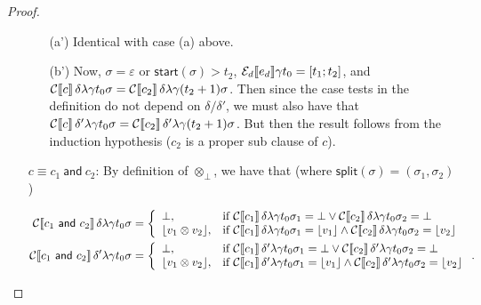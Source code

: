 \documentclass[orivec,final]{llncs-href}
\newcommand{\tracestart}{\mathsf{start}}
\newcommand{\tracesplit}{\mathsf{split}}
\newcommand{\lift}[1]{\lfloor #1 \rfloor}
\newcommand{\trace}{\sigma}
\newcommand{\emptytrace}{\varepsilon}
\newcommand{\cand}[2]{#1\ \mathsf{and}\ #2}
\newcommand{\canddefault}{\cand{c_1}{c_2}}
\begin{document}
\begin{proof}
\begin{itemize}
\begin{itemize}
      \item[(a')] Identical with case (a) above.
      \item[(b')] Now, $\trace = \emptytrace$ or $\tracestart(\trace)
        > t_2$, $\mathcal{E}_d\llbracket e_d \rrbracket \gamma t_0 = [t_1;t_2]$, and
        $\cdenclause{c}{\delta}{\lambda}{\gamma}{t_0}{\trace} =
        \cdenclause{c_2}{\delta}{\lambda}{\gamma}{(t_2+1)}{\trace}$. Then
        since the case tests in the definition do not depend on
        $\delta/\delta'$, we must also have that
        $\cdenclause{c}{\delta'}{\lambda}{\gamma}{t_0}{\trace} = 
        \cdenclause{c_2}{\delta'}{\lambda}{\gamma}{(t_2+1)}{\trace}$. But then the
        result follows from the induction hypothesis ($c_2$ is a proper
        sub clause of $c$).
      \end{itemize}
  \item[$c \equiv \canddefault$:]
    By definition of $\otimes_\bot$, we have that (where
    $\tracesplit(\trace) = (\trace_1,\trace_2)$)
    \begin{scriptsize}
      \begin{align*}
        \cdenclause{\canddefault}{\delta}{\lambda}{\gamma}{t_0}{\trace} &=
        \left\{ \begin{array}{ll}
            \bot, &\mbox{if }
            \cdenclause{c_1}{\delta}{\lambda}{\gamma}{t_0}{\trace_1} =
            \bot \lor
            \cdenclause{c_2}{\delta}{\lambda}{\gamma}{t_0}{\trace_2} =
            \bot\\
            \lift{v_1 \otimes v_2}, &\mbox{if }
            \cdenclause{c_1}{\delta}{\lambda}{\gamma}{t_0}{\trace_1} = 
            \lift{v_1} \land
            \cdenclause{c_2}{\delta}{\lambda}{\gamma}{t_0}{\trace_2} =
            \lift{v_2}
          \end{array}\right.\\
        \cdenclause{\canddefault}{\delta'}{\lambda}{\gamma}{t_0}{\trace} &=
        \left\{ \begin{array}{ll}
            \bot, &\mbox{if }
            \cdenclause{c_1}{\delta'}{\lambda}{\gamma}{t_0}{\trace_1} =
            \bot \lor
            \cdenclause{c_2}{\delta'}{\lambda}{\gamma}{t_0}{\trace_2} =
            \bot\\
            \lift{v_1 \otimes v_2}, &\mbox{if }
            \cdenclause{c_1}{\delta'}{\lambda}{\gamma}{t_0}{\trace_1} = 
            \lift{v_1} \land
            \cdenclause{c_2}{\delta'}{\lambda}{\gamma}{t_0}{\trace_2} =
            \lift{v_2}
          \end{array}\right. .

\end{align*}
\end{scriptsize}
\end{itemize}
\end{proof}
\end{document}
